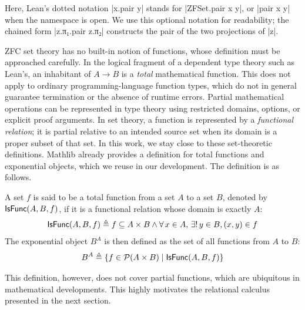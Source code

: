 Here, Lean's dotted notation \inlinelean|x.pair y| stands for \inlinelean|ZFSet.pair x y|, or \inlinelean|pair x y| when the namespace is open.
We use this optional notation for readability; the chained form \inlinelean|z.π₁.pair z.π₂| constructs the pair of the two projections of \inlinelean|z|.

ZFC set theory has no built-in notion of functions, whose definition must be approached carefully.
In the logical fragment of a dependent type theory such as Lean's, an inhabitant of \(A \to B\) is a \emph{total} mathematical function.
This does not apply to ordinary programming-language function types, which do not in general guarantee termination or the absence of runtime errors.
Partial mathematical operations can be represented in type theory using restricted domains, options, or explicit proof arguments.
In set theory, a function is represented by a \emph{functional relation}; it is partial relative to an intended source set when its domain is a proper subset of that set.
In this work, we stay close to these set-theoretic definitions.
Mathlib already provides a definition for total functions and exponential objects, which we reuse in our development.
The definition is as follows.
\begin{definition}
  A set \(f\) is said to be a total function from a set \(A\) to a set \(B\), denoted by \(\mathsf{IsFunc}(A, B, f)\), if it is a functional relation whose domain is exactly \(A\):
  \begin{equation*}
    \mathsf{IsFunc}(A, B, f) \triangleq f \subseteq A \times B \land \forall\, x \in A,\, \exists!\, y \in B, (x, y) \in f
  \end{equation*}
  The exponential object \(B^A\) is then defined as the set of all functions from \(A\) to \(B\):
  \begin{equation*}
    B^A \triangleq \{ f \in \mathcal{P}(A \times B) \mid \mathsf{IsFunc}(A, B, f) \}
  \end{equation*}
\end{definition}

This definition, however, does not cover partial functions, which are ubiquitous in mathematical developments.
This highly motivates the relational calculus presented in the next section.
